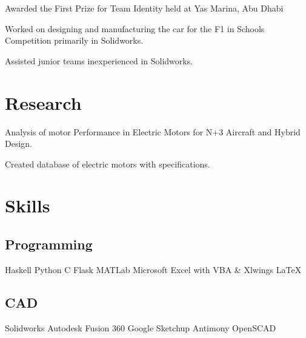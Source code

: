 \documentclass[a4paper]{deedy-resume}
\begin{document}
\begin{minipage}[t]{0.58\textwidth}
\begin{tightitemize}
\item Awarded the First Prize for Team Identity held at Yas Marina, Abu Dhabi 
\item Worked on designing and manufacturing the car for the F1 in Schools Competition primarily in Solidworks. 
\item Assisted junior teams inexperienced in Solidworks.
\end{tightitemize}
\sectionspace 


\section{Research}
\begin{tightitemize}
\item Analysis of motor Performance in Electric Motors for N+3 Aircraft and Hybrid Design.
\item Created database of electric motors with specifications.
\end{tightitemize}
\sectionspace 



\section{Skills}
\noindent
\begin{minipage}[t]{.45\textwidth}
{
\subsection{Programming}
 Haskell 
 \textbullet{} Python
 \textbullet{} C  
 \textbullet{} Flask
 \textbullet{} MATLab  
 \textbullet{} Microsoft Excel with VBA \& Xlwings 
 \textbullet{} \LaTeX\ 
 }
\end{minipage}%
\hspace*{.05\textwidth}
\begin{minipage}[t]{.49\textwidth}
{ \subsection{CAD}
 Solidworks  
 \textbullet{} Autodesk Fusion 360 \textbullet{} Google Sketchup \textbullet{} Antimony \textbullet{} OpenSCAD}
\end{minipage}


\end{minipage}
\end{document}
